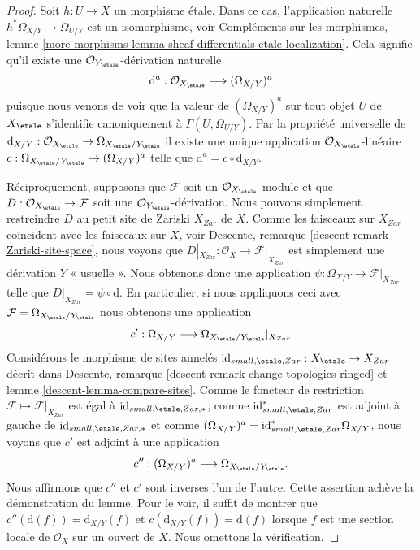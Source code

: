 \begin{proof}
Soit $h : U \to X$ un morphisme \'etale. Dans ce cas, l'application naturelle
$h^*\Omega_{X/Y} \to \Omega_{U/Y}$ est un isomorphisme, voir
Compléments sur les morphismes,
lemme \ref{more-morphisms-lemma-sheaf-differentials-etale-localization}.
Cela signifie qu'il existe une $\mathcal{O}_{Y_\etale}$-dérivation naturelle
$$
\text{d}^a : \mathcal{O}_{X_\etale} \longrightarrow (\Omega_{X/Y})^a
$$
puisque nous venons de voir que la valeur de $(\Omega_{X/Y})^a$ sur tout objet
$U$ de $X_\etale$ s'identifie canoniquement à
$\Gamma(U, \Omega_{U/Y})$. Par la propriété universelle de
$\text{d}_{X/Y} :
\mathcal{O}_{X_\etale}
\to
\Omega_{X_\etale/Y_\etale}$
il existe une unique application $\mathcal{O}_{X_\etale}$-linéaire
$c : \Omega_{X_\etale/Y_\etale} \to (\Omega_{X/Y})^a$
telle que
$\text{d}^a = c \circ \text{d}_{X/Y}$.

\medskip\noindent
Réciproquement, supposons que $\mathcal{F}$ soit un
$\mathcal{O}_{X_\etale}$-module
et que $D : \mathcal{O}_{X_\etale} \to \mathcal{F}$ soit une
$\mathcal{O}_{Y_\etale}$-dérivation. Nous pouvons simplement restreindre
$D$ au petit site de Zariski $X_{Zar}$ de $X$. Comme les faisceaux sur $X_{Zar}$
coïncident avec les faisceaux sur $X$, voir
Descente, remarque \ref{descent-remark-Zariski-site-space},
nous voyons que $D|_{X_{Zar}} : \mathcal{O}_X \to \mathcal{F}|_{X_{Zar}}$
est simplement une dérivation $Y$ « usuelle ». Nous obtenons donc une application
$\psi : \Omega_{X/Y} \longrightarrow \mathcal{F}|_{X_{Zar}}$
telle que $D|_{X_{Zar}} = \psi \circ \text{d}$. En particulier, si nous
appliquons ceci avec $\mathcal{F} = \Omega_{X_\etale/Y_\etale}$
nous obtenons une application
$$
c' :
\Omega_{X/Y}
\longrightarrow
\Omega_{X_\etale/Y_\etale}|_{X_{Zar}}
$$
Considérons le morphisme de sites annelés
$\text{id}_{small, \etale, Zar} : X_\etale \to X_{Zar}$
décrit dans
Descente, remarque \ref{descent-remark-change-topologies-ringed} et
lemme \ref{descent-lemma-compare-sites}.
Comme le foncteur de restriction $\mathcal{F} \mapsto \mathcal{F}|_{X_{Zar}}$
est égal à $\text{id}_{small, \etale, Zar, *}$, comme
$\text{id}_{small, \etale, Zar}^*$ est adjoint à gauche de
$\text{id}_{small, \etale, Zar, *}$ et comme
$(\Omega_{X/Y})^a = \text{id}_{small, \etale, Zar}^*\Omega_{X/Y}$,
nous voyons que $c'$ est adjoint à une application
$$
c'' :
(\Omega_{X/Y})^a
\longrightarrow
\Omega_{X_\etale/Y_\etale}.
$$
Nous affirmons que $c''$ et $c'$ sont inverses l'un de l'autre.
Cette assertion achève la démonstration du lemme.
Pour le voir, il suffit de montrer que $c''(\text{d}(f)) = \text{d}_{X/Y}(f)$
et $c(\text{d}_{X/Y}(f)) = \text{d}(f)$ lorsque $f$ est une section locale de
$\mathcal{O}_X$ sur un ouvert de $X$. Nous omettons la vérification.
\end{proof}

